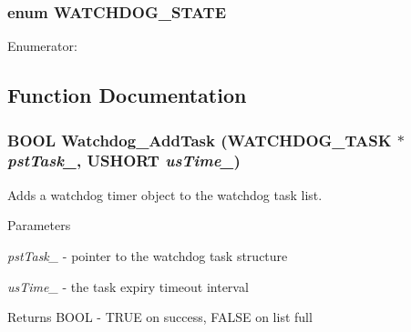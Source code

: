 \subsubsection[{WATCHDOG\_\-STATE}]{\setlength{\rightskip}{0pt plus 5cm}enum {\bf WATCHDOG\_\-STATE}}\label{watchdog_8h_a41071f26320ba786254326b134ceb892}
\begin{Desc}
\item[Enumerator: ]\par
\begin{description}
\item[{\em 
WDT\_\-TASK\_\-UNINIT\label{watchdog_8h_a41071f26320ba786254326b134ceb892ab14d2c2c4a664ccd993348e01a326932}
}]\item[{\em 
WDT\_\-TASK\_\-IDLE\label{watchdog_8h_a41071f26320ba786254326b134ceb892ac2e9d543d5506e2308b873cee916dcbb}
}]\item[{\em 
WDT\_\-TASK\_\-ACTIVE\label{watchdog_8h_a41071f26320ba786254326b134ceb892adbd775fd4ac30f22874e2855a26c855c}
}]\end{description}
\end{Desc}



\subsection{Function Documentation}
\subsubsection[{Watchdog\_\-AddTask}]{\setlength{\rightskip}{0pt plus 5cm}BOOL Watchdog\_\-AddTask ({\bf WATCHDOG\_\-TASK} $\ast$ {\em pstTask\_\-}, \/  USHORT {\em usTime\_\-})}\label{watchdog_8h_af3e84ded0a01c20b8577881423547211}
Adds a watchdog timer object to the watchdog task list.


\begin{DoxyParams}{Parameters}
\item[{\em pstTask\_\-}]-\/ pointer to the watchdog task structure \item[{\em usTime\_\-}]-\/ the task expiry timeout interval \end{DoxyParams}
\begin{DoxyReturn}{Returns}
BOOL -\/ TRUE on success, FALSE on list full 
\end{DoxyReturn}
